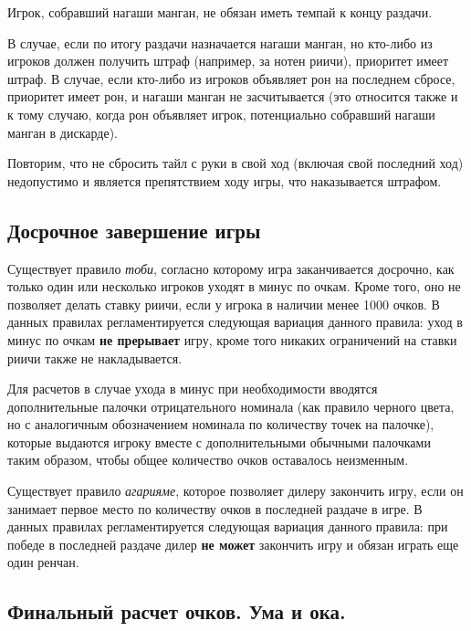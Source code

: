 \begin{additional}
\vspace{0.3cm}

Игрок, собравший нагаши манган, не обязан иметь темпай к концу раздачи.

\vspace{0.3cm}

В случае, если по итогу раздачи назначается нагаши манган, но кто-либо из игроков должен получить штраф (например, за нотен риичи), приоритет имеет штраф. В случае, если кто-либо из игроков объявляет рон на последнем сбросе, приоритет имеет рон, и нагаши манган не засчитывается (это относится также и к тому случаю, когда рон объявляет игрок, потенциально собравший нагаши манган в дискарде).

\vspace{0.3cm}

Повторим, что не сбросить тайл с руки в свой ход (включая свой последний ход) недопустимо и является препятствием ходу игры, что наказывается штрафом.

\end{additional}

\subsection{Досрочное завершение игры}

Существует правило \textit{тоби}, согласно которому игра заканчивается досрочно, как только один или несколько игроков уходят в минус по очкам. Кроме того, оно не позволяет делать ставку риичи, если у игрока в наличии менее 1000 очков. В данных правилах регламентируется следующая вариация данного правила: уход в минус по очкам \textbf{не прерывает} игру, кроме того никаких ограничений на ставки риичи также не накладывается.

Для расчетов в случае ухода в минус при необходимости вводятся дополнительные палочки отрицательного номинала (как правило черного цвета, но с аналогичным обозначением номинала по количеству точек на палочке), которые выдаются игроку вместе с дополнительными обычными палочками таким образом, чтобы общее количество очков оставалось неизменным.

Существует правило \textit{агарияме}, которое позволяет дилеру закончить игру, если он занимает первое место по количеству очков в последней раздаче в игре. В данных правилах регламентируется следующая вариация данного правила: при победе в последней раздаче дилер \textbf{не может} закончить игру и обязан играть еще один ренчан.

\subsection{Финальный расчет очков. Ума и ока.}

